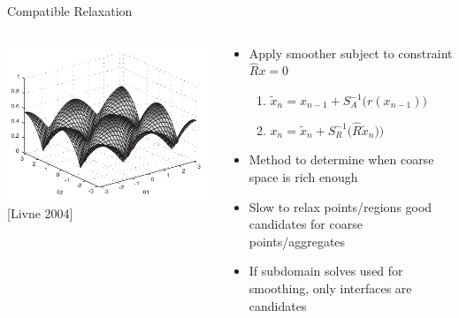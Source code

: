 \begin{frame}{Compatible Relaxation}
  \begin{columns}
    \begin{column}{0.5\textwidth}
      \includegraphics[width=\textwidth]{figures/LivneHabituatedCR} \\
      {\small [Livne 2004]}
    \end{column}
    \begin{column}{0.5\textwidth}
      \begin{itemize}
      \item Apply smoother subject to constraint $\hat R x = 0$
        \begin{enumerate}
        \item $\tilde x_n = x_{n-1} + S_A^{-1}\big(r(x_{n-1}) \big)$
        \item $x_n = \tilde x_n + S_R^{-1}\big(\hat R\tilde x_n) \big)$
        \end{enumerate}
      \item Method to determine when coarse space is rich enough
      \item Slow to relax points/regions good candidates for coarse points/aggregates
      \item If subdomain solves used for smoothing, only interfaces are candidates
      \end{itemize}
    \end{column}
  \end{columns}
\end{frame}
